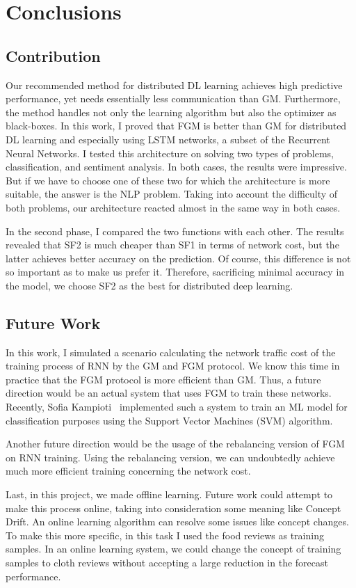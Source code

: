\chapter{Conclusions}\label{ch:conclusions}

\section{Contribution}\label{sec:conclusion}

Our recommended method for distributed DL learning achieves high predictive performance, yet needs essentially less communication than GM\@.
Furthermore, the method handles not only the learning algorithm but also the optimizer as black-boxes.
In this work, I proved that FGM is better than GM for distributed DL learning and especially using LSTM networks, a subset of the Recurrent Neural Networks.
I tested this architecture on solving two types of problems, classification, and sentiment analysis.
In both cases, the results were impressive.
But if we have to choose one of these two for which the architecture is more suitable, the answer is the NLP problem.
Taking into account the difficulty of both problems, our architecture reacted almost in the same way in both cases.

In the second phase, I compared the two functions with each other.
The results revealed that SF2 is much cheaper than SF1 in terms of network cost, but the latter achieves better accuracy on the prediction.
Of course, this difference is not so important as to make us prefer it.
Therefore, sacrificing minimal accuracy in the model, we choose SF2 as the best for distributed deep learning.

\section{Future Work}\label{sec:future-work}

In this work, I simulated a scenario calculating the network traffic cost of the training process of RNN by the GM and FGM protocol.
We know this time in practice that the FGM protocol is more efficient than GM.
Thus, a future direction would be an actual system that uses FGM to train these networks.
Recently, Sofia Kampioti~\cite{kampioti_sofia__thesis_2020} implemented such a system to train an ML model for classification purposes using the Support Vector Machines (SVM) algorithm.

Another future direction would be the usage of the rebalancing version of FGM on RNN training.
Using the rebalancing version, we can undoubtedly achieve much more efficient training concerning the network cost.

Last, in this project, we made offline learning.
Future work could attempt to make this process online, taking into consideration some meaning like Concept Drift.
An online learning algorithm can resolve some issues like concept changes.
To make this more specific, in this task I used the food reviews as training samples.
In an online learning system, we could change the concept of training samples to cloth reviews without accepting a large reduction in the forecast performance.
